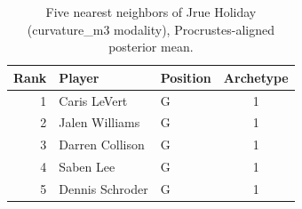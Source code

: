 \begin{table}[htbp]
  \centering\small
  \begin{tabular}{rllc}
    \toprule
    Rank & Player & Position & Archetype \\
    \midrule
    1 & Caris LeVert & G & 1 \\
    2 & Jalen Williams & G & 1 \\
    3 & Darren Collison & G & 1 \\
    4 & Saben Lee & G & 1 \\
    5 & Dennis Schroder & G & 1 \\
    \bottomrule
  \end{tabular}
  \caption{Five nearest neighbors of Jrue Holiday (curvature_m3 modality), Procrustes-aligned posterior mean.}
  \label{tab:Jrue_Holiday_neighbors_curvature_m3}
\end{table}

